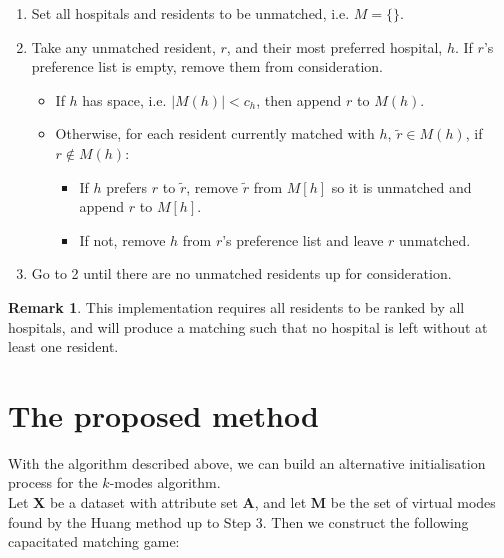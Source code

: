 \documentclass{article}
\theoremstyle{definition}
\newtheorem*{remark}{Remark}
\begin{document}
\begin{enumerate}
	\item Set all hospitals and residents to be unmatched, i.e. $M = \{\}$.
	
	\item Take any unmatched resident, $r$, and their most preferred hospital, $h$. If $r$'s preference list is empty, remove them from consideration.
	
		\begin{itemize}
			\item If $h$ has space, i.e. $|M(h)| < c_h$, then append $r$ to $M(h)$.
			
			\item Otherwise, for each resident currently matched with $h$, $\tilde{r} \in M(h)$, if $r \notin M(h)$:
			
				\begin{itemize}
					\item If $h$ prefers $r$ to $\tilde{r}$, remove $\tilde{r}$ from $M[h]$  so it is unmatched and append $r$ to $M[h]$.
					
					\item If not, remove $h$ from $r$'s preference list and leave $r$ unmatched.								
				\end{itemize}	
		\end{itemize}

	\item Go to 2 until there are no unmatched residents up for consideration.
\end{enumerate}

\begin{remark}
	This implementation requires all residents to be ranked by all hospitals, and will produce a matching such that no hospital is left without at least one resident.
\end{remark}



\section{The proposed method}\label{section:new-method}

With the algorithm described above, we can build an alternative initialisation process for the $k$-modes algorithm. \\

Let \textbf{X} be a dataset with attribute set \textbf{A}, and let \textbf{M} be the set of virtual modes found by the Huang method up to Step 3. Then we construct the following capacitated matching game:
\end{document}
